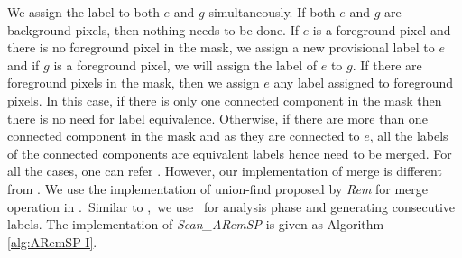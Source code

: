 We assign the label to both $e$ and $g$ simultaneously. If both $e$ and $g$ are
background pixels, then nothing needs to be done. If $e$ is a foreground pixel and there is no foreground pixel in the mask, we assign a 
new provisional label to $e$ and if $g$ is a foreground pixel, we will assign
the label of $e$ to $g$. If there are foreground pixels in the mask, then we assign $e$ any label assigned to 
foreground pixels. In this case, if there is only one connected component in the mask then there is 
no need for label equivalence. Otherwise, if there are more than one connected component in the mask and as 
they are connected to $e$, all the labels of the connected components are
equivalent labels hence need to be merged. For all the cases, one can refer
\cite{He2012_ARun}.
However, our implementation of merge is different from \cite{He2012_ARun}.
We use the implementation of union-find proposed by {\em Rem} \cite{Patwary2010_RemSP, Dijkstra1976_RemSP} for merge operation in
\aremsp.\ Similar to \nremsp,\ we use \flatten\ for analysis phase
and generating consecutive labels. The implementation of {\em Scan\_ARemSP} is given as Algorithm
\ref{alg:ARemSP-I}.

%
% 





 
